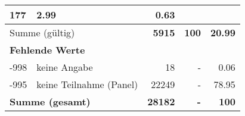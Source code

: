 \begin{longtable}{lXrrr}
       \num{177} &
       \num[round-mode=places,round-precision=2]{2.99} &
         \num[round-mode=places,round-precision=2]{0.63} \\
     \midrule
     \multicolumn{2}{l}{Summe (gültig)} &
       \textbf{\num{5915}} &
     \textbf{100} &
       \textbf{\num[round-mode=places,round-precision=2]{20.99}} \\
     \multicolumn{5}{l}{\textbf{Fehlende Werte}}\\
       -998 &
       keine Angabe &
         \num{18} &
        - &
         \num[round-mode=places,round-precision=2]{0.06} \\
       -995 &
       keine Teilnahme (Panel) &
         \num{22249} &
        - &
         \num[round-mode=places,round-precision=2]{78.95} \\
     \midrule
     \multicolumn{2}{l}{\textbf{Summe (gesamt)}} &
          \textbf{\num{28182}} &
        \textbf{-} &
        \textbf{100} \\
     \bottomrule
     \end{longtable}
     
